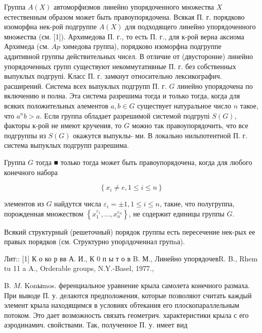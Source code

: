 \documentclass[10pt]{article}
\begin{document}
Группа $A(X)$ автоморфизмов линейно упорядоченного множества $X$ естественным образом может быть правоупорядочена. Всякая П. г. порядково изоморфна нек-рой подгруппе $A(X)$ для подходящего линейно упорядоченного множества (см. [1]). Архимедова П. г., то есть П. г., для к-рой верна аксиома Архимеда (см. $A p$ химедова группа), порядково изоморфна подгруппе аддитивной группы действительных чисел. В отличие от (двусторонне) линейно упорядоченных групп существуют некоммутативные П. г. без собственных выпуклых подгрупі. Класс П. г. замкнут относительно лексикографич. расширений. Система всех выпуклых подгрупп П. г. $G$ линейно упорядочена по включению и полна. Эта система разрешима тогда и только тогда, когда для всяких положительных әлементов $a, b \in G$ существует натуральное число $n$ такое, что $a^{n} b>a$. Если группа обладает разрешимой системой подгрупі $S(G)$, факторы к-рой не имеют кручения, то $G$ можно так правоупорядочить, что все подгруппы из $S(G)$ окажутся выпуклы- ми. В локально нильпотентной П. г. система выпуклых подгрупп разрешима.



Группа $G$ тогда ■ только тогда может быть правоупорядочена, когда для любого конечного набора



\[

\left\{x_{i} \neq e, 1 \leqslant i \leqslant n\right\}

\]



элементов из $G$ найдутся числа $\varepsilon_{i}= \pm 1,1 \leqslant i \leqslant n$, такие, что полугруппа, порожденная множеством $\left\{x_{1}^{\varepsilon_{1}}, \ldots, x_{n}^{\varepsilon_{n}}\right\}$, не содержит единицы группы $G$.



Всякий структурный (решеточный) порядок группы есть пересечение нек-рых ее правых порядков (см. Структурно упорлдоченнал групnа).



Лит:: [1] К о ко р вв А. И., К 0 п ы т о в B. М., Линейно упорядочевR. B., Rhem tu 11 a A., Orderable groups, N.Y.-Basel, 1977.,



B. $M$. Konыmos. ференциальное уравнение крыла самолета конечного размаха. При выводе П. у. делаются предположения, которые позволяют считать каждый элемент крыла находящимся в условиях обтекания его плоскопараллельным потоком. Это дает возможность связать геометрич. характеристики крыла с его аэродинамич. свойствами. Так, полученное П. у. имеет вид
\end{document}
